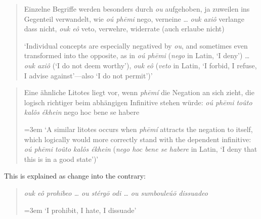 \begin{quote}
Einzelne Begriffe werden besonders durch \textit{ou} aufgehoben, ja zuweilen ins Gegenteil verwandelt, wie \textit{oú phēmi} nego, verneine {\dots} \textit{ouk axiô} verlange dass nicht, \textit{ouk eô} veto, verwehre, widerrate (auch erlaube nicht)

`Individual concepts are especially negatived by \textit{ou}, and sometimes even transformed into the opposite, as in \textit{oú phēmi} (\textit{nego} in Latin, `I deny') {\dots} \textit{ouk axiô} (`I do not deem worthy'), \textit{ouk eô} (\textit{veto} in Latin, `I forbid, I refuse, I advise against'---also `I do not permit')'\hfill\citep[\href{https://archive.org/details/griechischesprac00kr/page/296/mode/2up?view=theater}{§67 1.a.2}]{kruger1875griechische}
\end{quote}
\begin{quote}
Eine ähnliche Litotes liegt vor, wenn \textit{phēmí} die Negation an sich zieht, die logisch richtiger beim abhängigen Infinitive stehen würde: \textit{oú phēmi toûto kalôs ékhein} nego hoc bene se habere %

\emergencystretch=3em
`A similar litotes occurs when \textit{phēmí} attracts the negation to itself, which logically would more correctly stand with the dependent infinitive: \textit{oú phēmi toûto kalôs ékhein} (\textit{nego hoc bene se habere} in Latin, `I deny that this is in a good state')'\phantom{.}\hfill\citep[\href{https://archive.org/details/p2ausfhrlichegra02khuoft/page/180/mode/2up?q=litotes&view=theater}{180}]{kuhner1904ausfuhrliche}
\end{quote}

\noindent This is explained as change into the contrary:

\begin{quote}
\textit{\emph{ouk eô} prohibeo {\dots} \emph{ou stérgō} odi {\dots} \emph{ou sumbouleúō} dissuadeo}

\emergencystretch=3em
`I prohibit, I hate, I dissuade'\hfill \citep[\href{https://archive.org/details/p2ausfhrlichegra02khuoft/page/182/mode/2up?q=litotes&view=theater}{182}]{kuhner1904ausfuhrliche}
\end{quote}

